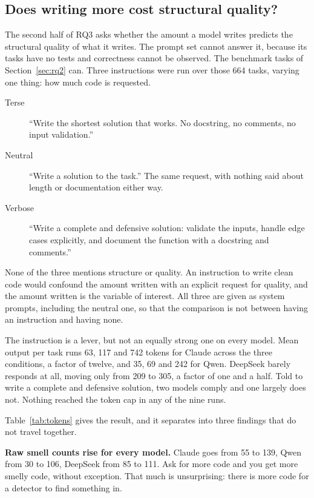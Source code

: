 \documentclass[10pt,a4paper,twocolumn]{article}
\begin{document}
\subsection{Does writing more cost structural quality?}
\label{sec:tokens}


The second half of RQ3 asks whether the amount a model writes predicts the
structural quality of what it writes. The prompt set cannot answer it, because
its tasks have no tests and correctness cannot be observed. The benchmark tasks of Section~\ref{sec:rq2} can. Three instructions were run
over those 664 tasks, varying one thing: how much
code is requested.

\begin{description}
  \item[Terse] ``Write the shortest solution that works. No docstring, no
        comments, no input validation.''
  \item[Neutral] ``Write a solution to the task.'' The same request, with nothing said about length or documentation either way.
  \item[Verbose] ``Write a complete and defensive solution: validate the inputs,
        handle edge cases explicitly, and document the function with a docstring
        and comments.''
\end{description}

None of the three mentions structure or quality. An instruction to write clean
code would confound the amount written with an explicit request for quality, and
the amount written is the variable of interest. All three are given as system
prompts, including the neutral one, so that the comparison is not between having
an instruction and having none.

The instruction is a lever, but not an equally strong one on every model. Mean
output per task runs 63, 117 and 742 tokens for Claude across the three
conditions, a factor of twelve, and 35, 69 and 242 for Qwen. DeepSeek barely
responds at all, moving only from 209 to 305, a factor of one and a half. Told
to write a complete and defensive solution, two models comply and one largely
does not. Nothing reached the token cap in any of the nine runs.

Table~\ref{tab:tokens} gives the result, and it separates into three findings that
do not travel together.

\textbf{Raw smell counts rise for every model.} Claude goes from 55 to 139,
Qwen from 30 to 106, DeepSeek from 85 to 111. Ask for more code and you get more
smelly code, without exception. That much is unsurprising: there is more code
for a detector to find something in.
\end{document}
